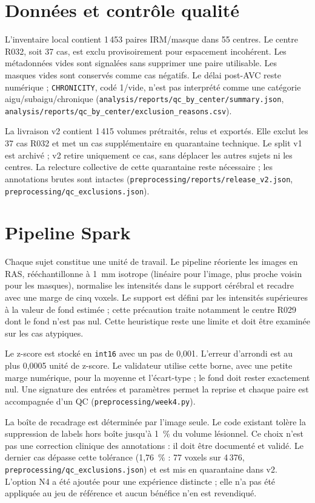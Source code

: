 \section{Données et contrôle qualité}
\label{sec:yosra-donnees}

L'inventaire local contient 1\,453 paires IRM/masque dans 55 centres.
Le centre R032, soit 37 cas, est exclu provisoirement pour espacement incohérent.
Les métadonnées vides sont signalées sans supprimer une paire utilisable.
Les masques vides sont conservés comme cas négatifs.
Le délai post-AVC reste numérique ; \texttt{CHRONICITY}, codé 1/vide, n'est pas interprété comme une catégorie aigu/subaigu/chronique
(\nolinkurl{analysis/reports/qc_by_center/summary.json}, \nolinkurl{analysis/reports/qc_by_center/exclusion_reasons.csv}).

La livraison v2 contient 1\,415 volumes prétraités, relus et exportés.
Elle exclut les 37 cas R032 et met un cas supplémentaire en quarantaine technique.
Le split v1 est archivé ; v2 retire uniquement ce cas, sans déplacer les autres sujets ni les centres.
La relecture collective de cette quarantaine reste nécessaire ; les annotations brutes sont intactes
(\nolinkurl{preprocessing/reports/release_v2.json}, \nolinkurl{preprocessing/qc_exclusions.json}).

\section{Pipeline Spark}
\label{sec:yosra-pipeline}

Chaque sujet constitue une unité de travail.
Le pipeline réoriente les images en RAS, rééchantillonne à 1~mm isotrope (linéaire pour l'image, plus proche voisin pour les masques), normalise les intensités dans le support cérébral et recadre avec une marge de cinq voxels.
Le support est défini par les intensités supérieures à la valeur de fond estimée ; cette précaution traite notamment le centre R029 dont le fond n'est pas nul.
Cette heuristique reste une limite et doit être examinée sur les cas atypiques.

Le z-score est stocké en \texttt{int16} avec un pas de 0,001.
L'erreur d'arrondi est au plus 0,0005 unité de z-score.
Le validateur utilise cette borne, avec une petite marge numérique, pour la moyenne et l'écart-type ; le fond doit rester exactement nul.
Une signature des entrées et paramètres permet la reprise et chaque paire est accompagnée d'un QC (\nolinkurl{preprocessing/week4.py}).

La boîte de recadrage est déterminée par l'image seule.
Le code existant tolère la suppression de labels hors boîte jusqu'à 1~\% du volume lésionnel.
Ce choix n'est pas une correction clinique des annotations : il doit être documenté et validé.
Le dernier cas dépasse cette tolérance (1,76~\% : 77 voxels sur 4\,376, \nolinkurl{preprocessing/qc_exclusions.json}) et est mis en quarantaine dans v2.
L'option N4 a été ajoutée pour une expérience distincte ; elle n'a pas été appliquée au jeu de référence et aucun bénéfice n'en est revendiqué.

